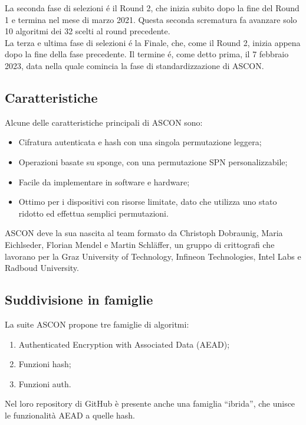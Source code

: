 \noindent La seconda fase di selezioni é il Round 2, che inizia subito dopo la fine del Round 1 e termina nel mese di marzo 2021. Questa seconda scrematura fa avanzare solo 10 algoritmi dei 32 scelti al round precedente\cite{nist-timeline}\cite{nist-competition}\cite{nist-round-2}. \\

\noindent La terza e ultima fase di selezioni é la Finale, che, come il Round 2, inizia appena dopo la fine della fase precedente. Il termine é, come detto prima, il 7 febbraio 2023, data nella quale comincia la fase di standardizzazione di ASCON\cite{nist-timeline}\cite{nist-competition}.

\subsection{Caratteristiche}

\noindent Alcune delle caratteristiche principali di ASCON sono:
\begin{itemize}
    \item Cifratura autenticata e hash con una singola permutazione leggera;
    \item Operazioni basate su sponge, con una permutazione SPN personalizzabile;
    \item Facile da implementare in software e hardware;
    \item Ottimo per i dispositivi con risorse limitate, dato che utilizza uno stato ridotto ed effettua semplici permutazioni.
\end{itemize}
ASCON deve la sua nascita al team formato da Christoph Dobraunig, Maria Eichlseder, Florian Mendel e Martin Schläffer\cite{ascon-contact}, un gruppo di crittografi che lavorano per la Graz University of Technology, Infineon Technologies, Intel Labs e Radboud University\cite{ascon-overview}.

\subsection{Suddivisione in famiglie}

La suite ASCON propone tre famiglie di algoritmi: \begin{enumerate}
    \item Authenticated Encryption with Associated Data (AEAD);
    \item Funzioni hash;
    \item Funzioni auth.
\end{enumerate}
Nel loro repository di GitHub\cite{github} è presente anche una famiglia ``ibrida'', che unisce le funzionalità AEAD a quelle hash.


